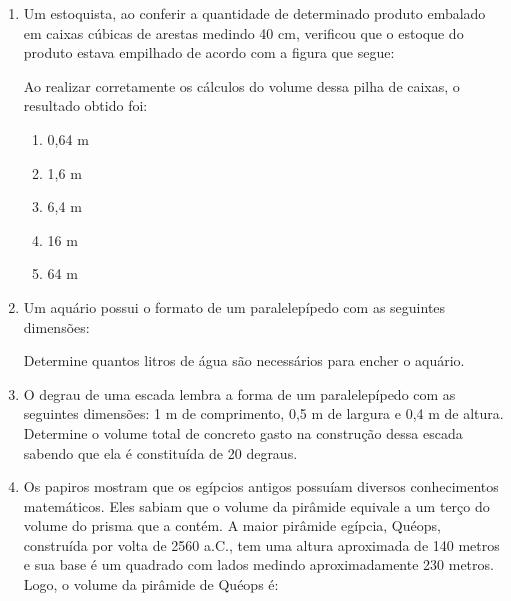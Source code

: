 \documentclass[twocolumn,oneside,a4paper,12pt]{article}
\begin{document}
\begin{enumerate}
\item Um estoquista, ao conferir a quantidade de determinado produto embalado em caixas cúbicas de arestas medindo 40 cm, verificou que o estoque do produto estava empilhado de acordo com a figura que segue:

Ao realizar corretamente os cálculos do volume dessa pilha de caixas, o resultado obtido foi:
\begin{enumerate}
\item 0,64 m
\item 1,6 m
\item 6,4 m
\item 16 m
\item 64 m
\end{enumerate}

\item Um aquário possui o formato de um paralelepípedo com as seguintes dimensões:

Determine quantos litros de água são necessários para encher o aquário.

\item O degrau de uma escada lembra a forma de um paralelepípedo com as seguintes dimensões: 1 m de comprimento, 0,5 m de largura e 0,4 m de altura. Determine o volume total de concreto gasto na construção dessa escada sabendo que ela é constituída de 20 degraus.

\item Os papiros mostram que os egípcios antigos possuíam diversos conhecimentos matemáticos. Eles sabiam que o volume da pirâmide equivale a um terço do volume do prisma que a contém. A maior pirâmide egípcia, Quéops, construída por volta de 2560 a.C., tem uma altura aproximada de 140 metros e sua base é um quadrado com lados medindo aproximadamente 230 metros. Logo, o volume da pirâmide de Quéops é:



\end{enumerate}
\end{document}
